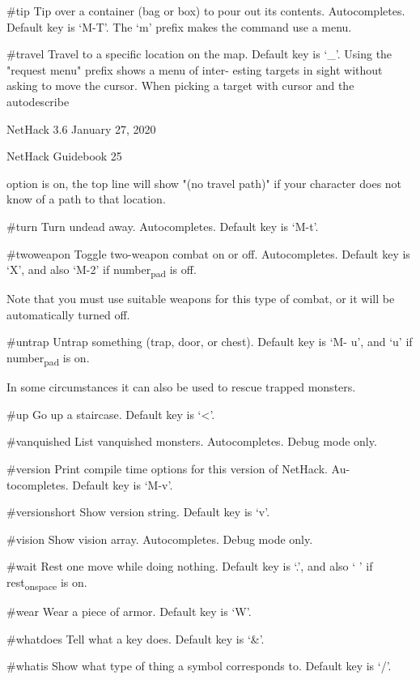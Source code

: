 \documentclass[11pt]{article}
\begin{document}
\#tip
   Tip over a container (bag or box) to pour out its contents.
   Autocompletes. Default key is `M-T'. The `m' prefix makes
   the command use a menu.

\#travel
   Travel to a specific location on the map. Default key is
   `\_'. Using the "request menu" prefix shows a menu of inter-
   esting targets in sight without asking to move the cursor.
   When picking a target with cursor and the autodescribe


NetHack 3.6                   January 27, 2020





NetHack Guidebook                       25



option is on, the top line will show "(no travel path)" if
your character does not know of a path to that location.

\#turn
   Turn undead away. Autocompletes. Default key is `M-t'.

\#twoweapon
   Toggle two-weapon combat on or off. Autocompletes. Default
   key is `X', and also `M-2' if number\textsubscript{pad} is off.

Note that you must use suitable weapons for this type of
combat, or it will be automatically turned off.

\#untrap
   Untrap something (trap, door, or chest). Default key is `M-
   u', and `u' if number\textsubscript{pad} is on.

In some circumstances it can also be used to rescue trapped
monsters.

\#up
   Go up a staircase. Default key is `<'.

\#vanquished
   List vanquished monsters. Autocompletes. Debug mode only.

\#version
   Print compile time options for this version of NetHack. Au-
   tocompletes. Default key is `M-v'.

\#versionshort
   Show version string. Default key is `v'.

\#vision
   Show vision array. Autocompletes. Debug mode only.

\#wait
   Rest one move while doing nothing. Default key is `.', and
   also ` ' if rest\textsubscript{on}\textsubscript{space} is on.

\#wear
   Wear a piece of armor. Default key is `W'.

\#whatdoes
   Tell what a key does. Default key is `\&'.

\#whatis
   Show what type of thing a symbol corresponds to.  Default
   key is `/'.
\end{document}
